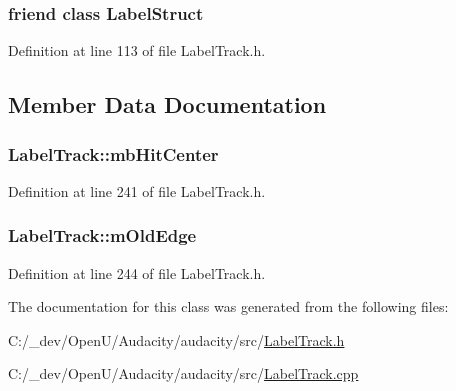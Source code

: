 \subsubsection[{\texorpdfstring{Label\+Struct}{LabelStruct}}]{\setlength{\rightskip}{0pt plus 5cm}friend class {\bf Label\+Struct}\hspace{0.3cm}{\ttfamily [friend]}}\hypertarget{class_label_track_a385c3071b8a0c30580fd8b8e984a1fc0}{}\label{class_label_track_a385c3071b8a0c30580fd8b8e984a1fc0}


Definition at line 113 of file Label\+Track.\+h.



\subsection{Member Data Documentation}
\subsubsection[{\texorpdfstring{mb\+Hit\+Center}{mbHitCenter}}]{ Label\+Track\+::mb\+Hit\+Center}\hypertarget{class_label_track_acd6d833a85610bf24cb008932585839f}{}\label{class_label_track_acd6d833a85610bf24cb008932585839f}


Definition at line 241 of file Label\+Track.\+h.

\subsubsection[{\texorpdfstring{m\+Old\+Edge}{mOldEdge}}]{ Label\+Track\+::m\+Old\+Edge}\hypertarget{class_label_track_a8e2ceac066c4986b80213070c8950016}{}\label{class_label_track_a8e2ceac066c4986b80213070c8950016}


Definition at line 244 of file Label\+Track.\+h.



The documentation for this class was generated from the following files\+:\begin{DoxyCompactItemize}
\item 
C\+:/\+\_\+dev/\+Open\+U/\+Audacity/audacity/src/\hyperlink{_label_track_8h}{Label\+Track.\+h}\item 
C\+:/\+\_\+dev/\+Open\+U/\+Audacity/audacity/src/\hyperlink{_label_track_8cpp}{Label\+Track.\+cpp}\end{DoxyCompactItemize}
